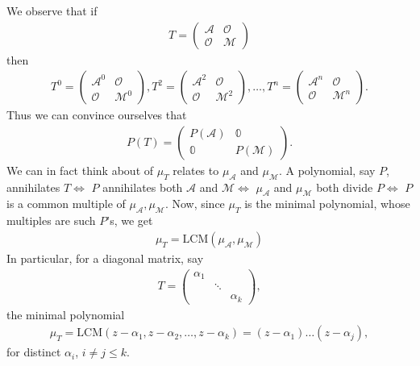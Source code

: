 \documentclass{article}
\theoremstyle{definition}
\newcommand{\A}{\mathcal{A}}
\newcommand{\M}{\mathcal{M}}
\begin{document}
We observe that if
\begin{align*}
T = \begin{pmatrix}
\A & \mathcal{O}\\
\mathcal{O} & \M
\end{pmatrix}
\end{align*}
then
\begin{align*}
T^0 = \begin{pmatrix}
\A^0 & \mathcal{O}\\
\mathcal{O} & \M^0
\end{pmatrix}, 
T^2 = \begin{pmatrix}
\A^2 & \mathcal{O}\\
\mathcal{O} & \M^2
\end{pmatrix}, 
\dots,
T^n = \begin{pmatrix}
\A^n & \mathcal{O}\\
\mathcal{O} & \M^n
\end{pmatrix}.
\end{align*}
Thus we can convince ourselves that
\begin{align*}
P(T) = \begin{pmatrix}
P(\A) & \mathbb{0}\\
\mathbb{0} & P(\M)
\end{pmatrix}.
\end{align*}
We can in fact think about of $\mu_T$ relates to $\mu_\A$ and $\mu_\M$. A polynomial, say $P$, annihilates $T \iff$ $P$ annihilates both $\A$ and $\M \iff$ $\mu_\A$ and $\mu_\M$ both divide $P \iff$ $P$ is a common multiple of $\mu_\A, \mu_\M$. Now, since $\mu_T$ is the minimal polynomial, whose multiples are such $P$'s, we get
\begin{align*}
\boxed{\mu_T = \text{LCM}(\mu_\A, \mu_\M)}
\end{align*}  
In particular, for a diagonal matrix, say
\begin{align*}
T = \begin{pmatrix}
\alpha_1 & & \\
& \ddots & \\
& & \alpha_k
\end{pmatrix},
\end{align*}
the minimal polynomial 
\begin{align*}
\mu_T = \text{LCM}(z-\alpha_1, z-\alpha_2, \dots, z-\alpha_k) = (z- \alpha_1)\dots(z-\alpha_j),
\end{align*}
for distinct $\alpha_i$, $i\neq j \leq k$.
\end{document}
